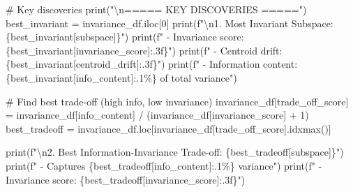 \documentclass[
  letterpaper,
  DIV=11,
  numbers=noendperiod]{scrartcl}
\newenvironment{Shaded}{\begin{snugshade}}{\end{snugshade}}
\newcommand{\BuiltInTok}[1]{\textcolor[rgb]{0.00,0.23,0.31}{#1}}
\newcommand{\CharTok}[1]{\textcolor[rgb]{0.13,0.47,0.30}{#1}}
\newcommand{\CommentTok}[1]{\textcolor[rgb]{0.37,0.37,0.37}{#1}}
\newcommand{\DecValTok}[1]{\textcolor[rgb]{0.68,0.00,0.00}{#1}}
\newcommand{\NormalTok}[1]{\textcolor[rgb]{0.00,0.23,0.31}{#1}}
\newcommand{\OperatorTok}[1]{\textcolor[rgb]{0.37,0.37,0.37}{#1}}
\newcommand{\SpecialCharTok}[1]{\textcolor[rgb]{0.37,0.37,0.37}{#1}}
\newcommand{\SpecialStringTok}[1]{\textcolor[rgb]{0.13,0.47,0.30}{#1}}
\newcommand{\StringTok}[1]{\textcolor[rgb]{0.13,0.47,0.30}{#1}}
\renewenvironment{Shaded}{%
  \begin{tcolorbox}[%
    enhanced,%
    colback=codebg,%
    colframe=codebg,%
    borderline west={3pt}{0pt}{sectionblue},%
    fontupper=\small\ttfamily,%
    boxrule=0pt,%
    arc=0pt,%
    boxsep=5pt,%
    left=2mm,%
    right=2mm,%
    top=2mm,%
    bottom=2mm%
  ]%
}{%
  \end{tcolorbox}%
}
\begin{document}
\begin{Shaded}
\begin{Highlighting}[]
\CommentTok{\# Key discoveries}
\BuiltInTok{print}\NormalTok{(}\StringTok{"}\CharTok{\textbackslash{}n}\StringTok{===== KEY DISCOVERIES ====="}\NormalTok{)}
\NormalTok{best\_invariant }\OperatorTok{=}\NormalTok{ invariance\_df.iloc[}\DecValTok{0}\NormalTok{]}
\BuiltInTok{print}\NormalTok{(}\SpecialStringTok{f"}\CharTok{\textbackslash{}n}\SpecialStringTok{1. Most Invariant Subspace: }\SpecialCharTok{\{}\NormalTok{best\_invariant[}\StringTok{\textquotesingle{}subspace\textquotesingle{}}\NormalTok{]}\SpecialCharTok{\}}\SpecialStringTok{"}\NormalTok{)}
\BuiltInTok{print}\NormalTok{(}\SpecialStringTok{f"   {-} Invariance score: }\SpecialCharTok{\{}\NormalTok{best\_invariant[}\StringTok{\textquotesingle{}invariance\_score\textquotesingle{}}\NormalTok{]}\SpecialCharTok{:.3f\}}\SpecialStringTok{"}\NormalTok{)}
\BuiltInTok{print}\NormalTok{(}\SpecialStringTok{f"   {-} Centroid drift: }\SpecialCharTok{\{}\NormalTok{best\_invariant[}\StringTok{\textquotesingle{}centroid\_drift\textquotesingle{}}\NormalTok{]}\SpecialCharTok{:.3f\}}\SpecialStringTok{"}\NormalTok{)}
\BuiltInTok{print}\NormalTok{(}\SpecialStringTok{f"   {-} Information content: }\SpecialCharTok{\{}\NormalTok{best\_invariant[}\StringTok{\textquotesingle{}info\_content\textquotesingle{}}\NormalTok{]}\SpecialCharTok{:.1\%\}}\SpecialStringTok{ of total variance"}\NormalTok{)}

\CommentTok{\# Find best trade{-}off (high info, low invariance)}
\NormalTok{invariance\_df[}\StringTok{\textquotesingle{}trade\_off\_score\textquotesingle{}}\NormalTok{] }\OperatorTok{=}\NormalTok{ invariance\_df[}\StringTok{\textquotesingle{}info\_content\textquotesingle{}}\NormalTok{] }\OperatorTok{/}\NormalTok{ (invariance\_df[}\StringTok{\textquotesingle{}invariance\_score\textquotesingle{}}\NormalTok{] }\OperatorTok{+} \DecValTok{1}\NormalTok{)}
\NormalTok{best\_tradeoff }\OperatorTok{=}\NormalTok{ invariance\_df.loc[invariance\_df[}\StringTok{\textquotesingle{}trade\_off\_score\textquotesingle{}}\NormalTok{].idxmax()]}

\BuiltInTok{print}\NormalTok{(}\SpecialStringTok{f"}\CharTok{\textbackslash{}n}\SpecialStringTok{2. Best Information{-}Invariance Trade{-}off: }\SpecialCharTok{\{}\NormalTok{best\_tradeoff[}\StringTok{\textquotesingle{}subspace\textquotesingle{}}\NormalTok{]}\SpecialCharTok{\}}\SpecialStringTok{"}\NormalTok{)}
\BuiltInTok{print}\NormalTok{(}\SpecialStringTok{f"   {-} Captures }\SpecialCharTok{\{}\NormalTok{best\_tradeoff[}\StringTok{\textquotesingle{}info\_content\textquotesingle{}}\NormalTok{]}\SpecialCharTok{:.1\%\}}\SpecialStringTok{ variance"}\NormalTok{)}
\BuiltInTok{print}\NormalTok{(}\SpecialStringTok{f"   {-} Invariance score: }\SpecialCharTok{\{}\NormalTok{best\_tradeoff[}\StringTok{\textquotesingle{}invariance\_score\textquotesingle{}}\NormalTok{]}\SpecialCharTok{:.3f\}}\SpecialStringTok{"}\NormalTok{)}


\end{Highlighting}
\end{Shaded}
\end{document}
